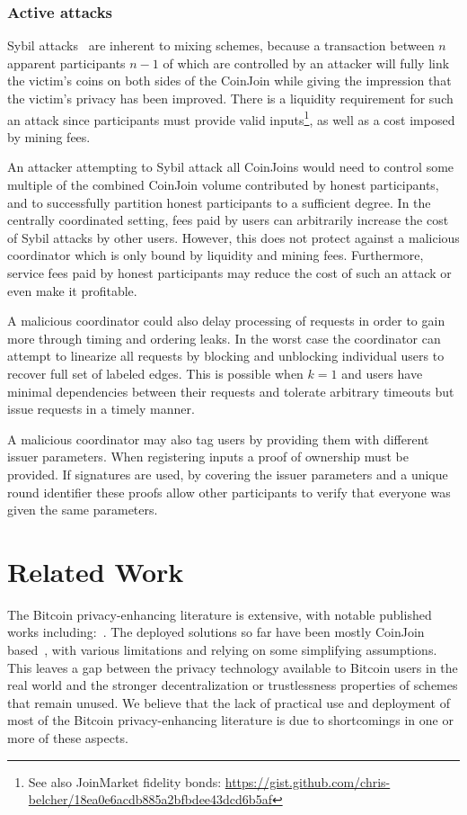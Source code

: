 \documentclass[a4paper]{article}
\begin{document}
\subsubsection{Active attacks}

Sybil attacks~\cite{douceur2002sybil} are inherent to mixing schemes, because a transaction between $n$ apparent participants $n-1$ of which are controlled by an attacker will fully link the victim's coins on both sides of the CoinJoin while giving the impression that the victim's privacy has been improved. There is a liquidity requirement for such an attack since participants must provide valid inputs\footnote{See also JoinMarket fidelity bonds: \url{https://gist.github.com/chris-belcher/18ea0e6acdb885a2bfbdee43dcd6b5af}}, as well as a cost imposed by mining fees.

An attacker attempting to Sybil attack all CoinJoins would need to control some multiple of the combined CoinJoin volume contributed by honest participants, and to successfully partition honest participants to a sufficient degree. In the centrally coordinated setting, fees paid by users can arbitrarily increase the cost of Sybil attacks by other users. However, this does not protect against a malicious coordinator which is only bound by liquidity and mining fees. Furthermore, service fees paid by honest participants may reduce the cost of such an attack or even make it profitable.

A malicious coordinator could also delay processing of requests in order to gain more through timing and ordering leaks. In the worst case the coordinator can attempt to linearize all requests by blocking and unblocking individual users to recover full set of labeled edges. This is possible when $k=1$ and users have minimal dependencies between their requests and tolerate arbitrary timeouts but issue requests in a timely manner.

A malicious coordinator may also tag users by providing them with different issuer parameters. When registering inputs a proof of ownership must be provided. If signatures are used, by covering the issuer parameters and a unique round identifier these proofs allow other participants to verify that everyone was given the same parameters.

\section{Related Work}\label{sec:relatedwork}

The Bitcoin privacy-enhancing literature is extensive, with notable published works including:~\cite{bonneau2014mixcoin,bissias2014sybil,ruffing2014coinshuffle,valenta2015blindcoin,ziegeldorf2015coinparty,ruffing2017p2p,maurer2017anonymous,heilman2017tumblebit}. The deployed solutions so far have been mostly CoinJoin based~\cite{maxwell2013coinjoin}, with various limitations and relying on some simplifying assumptions. This leaves a gap between the privacy technology available to Bitcoin users in the real world and the stronger decentralization or trustlessness properties of schemes that remain unused. We believe that the lack of practical use and deployment of most of the Bitcoin privacy-enhancing literature is due to shortcomings in one or more of these aspects.
 
\end{document}
